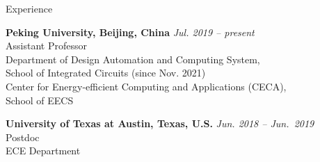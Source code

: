 
\begin{rSection}{Experience}

{\bf Peking University, Beijing, China}                           \hfill {\em Jul. 2019 -- present} \\
Assistant Professor \\
Department of Design Automation and Computing System, \\
School of Integrated Circuits (since Nov. 2021) \\
Center for Energy-efficient Computing and Applications (CECA), \\
School of EECS

{\bf University of Texas at Austin, Texas, U.S.}                           \hfill {\em Jun. 2018 -- Jun.~2019} \\
Postdoc \\
ECE Department

%
%
%
%


\end{rSection}


